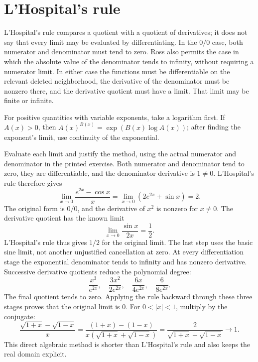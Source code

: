 \section{L'Hospital's rule}
L'Hospital's rule compares a quotient with a quotient of derivatives; it does not say that every limit may be evaluated by differentiating. In the $0/0$ case, both numerator and denominator must tend to zero. Ross also permits the case in which the absolute value of the denominator tends to infinity, without requiring a numerator limit. In either case the functions must be differentiable on the relevant deleted neighborhood, the derivative of the denominator must be nonzero there, and the derivative quotient must have a limit. That limit may be finite or infinite.

For positive quantities with variable exponents, take a logarithm first. If $A(x)>0$, then $A(x)^{B(x)}=\exp(B(x)\log A(x))$; after finding the exponent's limit, use continuity of the exponential.

\goal Evaluate each limit and justify the method, using the actual numerator and denominator in the printed exercise.
Both numerator and denominator tend to zero, they are differentiable, and the denominator derivative is $1\ne0$. L'Hospital's rule therefore gives
\[
 \lim_{x\to0}\frac{e^{2x}-\cos x}{x}
 =\lim_{x\to0}(2e^{2x}+\sin x)=2.
\]
The original form is $0/0$, and the derivative of $x^2$ is nonzero for $x\ne0$. The derivative quotient has the known limit
\[
 \lim_{x\to0}\frac{\sin x}{2x}=\frac12.
\]
L'Hospital's rule thus gives $1/2$ for the original limit. The last step uses the basic sine limit, not another unjustified cancellation at zero.
At every differentiation stage the exponential denominator tends to infinity and has nonzero derivative. Successive derivative quotients reduce the polynomial degree:
\[
 \frac{x^3}{e^{2x}},\quad \frac{3x^2}{2e^{2x}},\quad
 \frac{6x}{4e^{2x}},\quad \frac6{8e^{2x}}.
\]
The final quotient tends to zero. Applying the rule backward through these three stages proves that the original limit is $0$.
For $0<|x|<1$, multiply by the conjugate:
\[
 \frac{\sqrt{1+x}-\sqrt{1-x}}x
 =\frac{(1+x)-(1-x)}{x(\sqrt{1+x}+\sqrt{1-x})}
 =\frac2{\sqrt{1+x}+\sqrt{1-x}}\longrightarrow1.
\]
This direct algebraic method is shorter than L'Hospital's rule and also keeps the real domain explicit.

